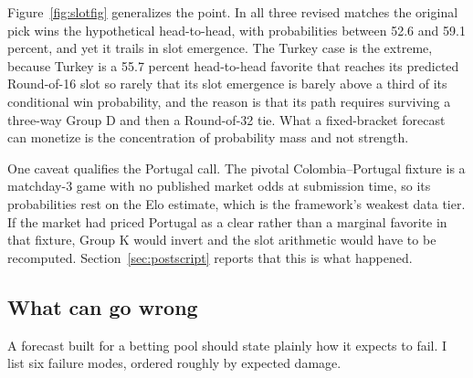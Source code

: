 \documentclass[11pt,a4paper]{article}
\begin{document}
Figure~\ref{fig:slotfig} generalizes the point. In all three revised matches the original pick wins the hypothetical head-to-head, with probabilities between 52.6 and 59.1 percent, and yet it trails in slot emergence. The Turkey case is the extreme, because Turkey is a 55.7 percent head-to-head favorite that reaches its predicted Round-of-16 slot so rarely that its slot emergence is barely above a third of its conditional win probability, and the reason is that its path requires surviving a three-way Group D and then a Round-of-32 tie. What a fixed-bracket forecast can monetize is the concentration of probability mass and not strength.

One caveat qualifies the Portugal call. The pivotal Colombia--Portugal fixture is a matchday-3 game with no published market odds at submission time, so its probabilities rest on the Elo estimate, which is the framework's weakest data tier. If the market had priced Portugal as a clear rather than a marginal favorite in that fixture, Group K would invert and the slot arithmetic would have to be recomputed. Section~\ref{sec:postscript} reports that this is what happened.

\subsection{What can go wrong}

A forecast built for a betting pool should state plainly how it expects to fail. I list six failure modes, ordered roughly by expected damage.
\end{document}
